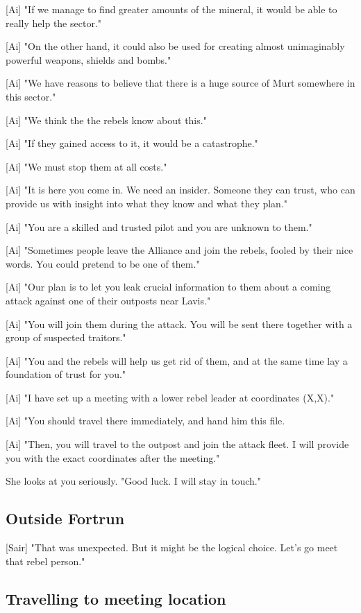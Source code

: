 \documentclass[a4paper,12pt]{article}
\begin{document}
[Ai] "If we manage to find greater amounts of the mineral, it would be able to really
help the sector."

[Ai] "On the other hand, it could also be used for creating almost unimaginably powerful weapons, shields
and bombs."

[Ai] "We have reasons to believe that there is a huge source of Murt somewhere in this sector." 

[Ai] "We think the the rebels know about this." 

[Ai] "If they gained access to it, it would be a catastrophe." 

[Ai] "We must stop them at all costs."

[Ai] "It is here you come in. We need an insider. Someone they can trust, who can
provide us with insight into what they know and what they plan."

[Ai] "You are a skilled and trusted pilot and you are unknown to them." 

[Ai] "Sometimes people leave the Alliance and join the rebels, fooled by their nice words.
	You could pretend to be one of them."

[Ai] "Our plan is to let you leak crucial information to them about a coming attack against
one of their outposts near Lavis." 

[Ai] "You will join them during the attack. You will be sent there together with a group of suspected
traitors." 

[Ai] "You and the rebels will help us get rid of them, and at the same time
lay a foundation of trust for you."

[Ai] "I have set up a meeting with a lower rebel leader at coordinates (X,X)." 

[Ai] "You should travel there immediately, and hand him this file. 

[Ai] "Then, you will travel to the outpost and join the attack fleet. I will provide you with the exact coordinates
after the meeting."

She looks at you seriously. "Good luck. I will stay in touch."

\subsection{Outside Fortrun}

[Sair] "That was unexpected. But it might be the logical choice. Let's go meet that rebel person."

\subsection{Travelling to meeting location}
\end{document}
